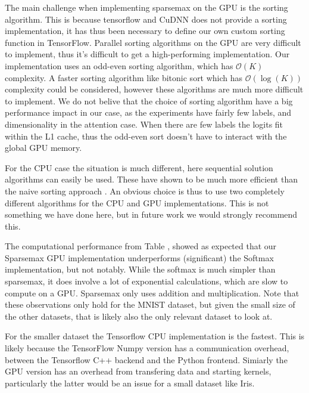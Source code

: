 The main challenge when implementing sparsemax on the GPU is the sorting algorithm. This is because tensorflow and CuDNN does not provide a sorting implementation, it has thus been necessary to define our own custom sorting function in TensorFlow. Parallel sorting algorithms on the GPU are very difficult to implement, thus it's difficult to get a high-performing implementation. Our implementation uses an odd-even sorting algorithm, which has $\mathcal{O}(K)$ complexity. A faster sorting algorithm like bitonic sort which has $\mathcal{O}(\log(K))$ complexity could be considered, however these algorithms are much more difficult to implement. We do not belive that the choice of sorting algorithm have a big performance impact in our case, as the experiments have fairly few labels, and dimensionality in the attention case. When there are few labels the logits fit within the L1 cache, thus the odd-even sort doesn't have to interact with the global GPU memory. 

For the CPU case the situation is much different, here sequential solution algorithms can easily be used. These have shown to be much more efficient than the naive sorting approach \cite{Liu2016}. An obvious choice is thus to use two completely different algorithms for the CPU and GPU implementations. This is not something we have done here, but in future work we would strongly recommend this.

The computational performance from Table \label{tab:timings}, showed as expected that our Sparsemax GPU implementation underperforms (significant) the Softmax implementation, but not notably. While the softmax is much simpler than sparsemax, it does involve a lot of exponential calculations, which are slow to compute on a GPU. Sparsemax only uses addition and multiplication. Note that these observations only hold for the MNIST dataset, but given the small size of the other datasets, that is likely also the only relevant dataset to look at.

For the smaller dataset the Tensorflow CPU implementation is the fastest. This is likely because the TensorFlow Numpy version has a communication overhead, between the Tensorflow C++ backend and the Python frontend. Simiarly the GPU version has an overhead from transfering data and starting kernels, particularly the latter would be an issue for a small dataset like Iris.

